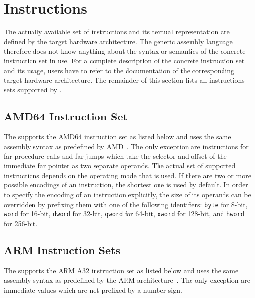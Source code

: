 \section{Instructions}\label{sec:asminstructions}

The actually available set of instructions and its textual representation are defined by the target hardware architecture.
The generic assembly language therefore does not know anything about the syntax or semantics of the concrete instruction set in use.
For a complete description of the concrete instruction set and its usage, users have to refer to the documentation of the corresponding target hardware architecture.
The remainder of this section lists all instructions sets supported by \ecs{}.

\renewcommand{\instruction}[2]{\pdftooltip{\texttt{#1}}{#2}\space}
\renewcommand{\instructionset}[1]{\begin{quote}\sloppy\footnotesize\end{quote}}

\subsection{AMD64 Instruction Set}

The \ecs{} supports the AMD64 instruction set as listed below and uses the same assembly syntax as predefined by AMD~\cite{amd64:volume3,amd64:volume4,amd64:volume5}.
The only exception are instructions for far procedure calls and far jumps which take the selector and offset of the immediate far pointer as two separate operands.
The actual set of supported instructions depends on the operating mode that is used.
If there are two or more possible encodings of an instruction, the shortest one is used by default.
In order to specify the encoding of an instruction explicitly, the size of its operands can be overridden by prefixing them with one of the following identifiers:
\texttt{byte} for 8-bit, \texttt{word} for 16-bit, \texttt{dword} for 32-bit, \texttt{qword} for 64-bit, \texttt{oword} for 128-bit, and \texttt{hword} for 256-bit.
\seeamd

\instructionset{amd64}

\subsection{ARM Instruction Sets}

The \ecs{} supports the ARM A32 instruction set as listed below and uses the same assembly syntax as predefined by the ARM architecture~\cite{arm:instructionset}.
The only exception are immediate values which are not prefixed by a number sign.
\seearm

